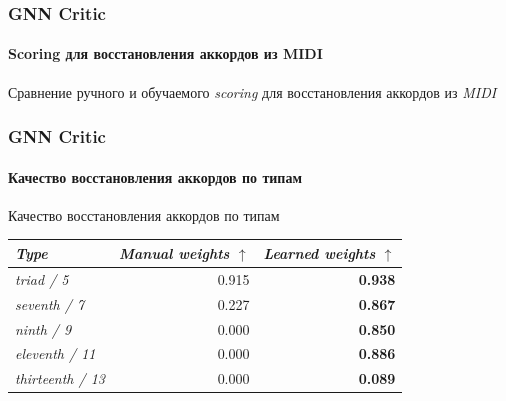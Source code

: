 \documentclass[aspectratio=169]{beamer}
\begin{document}
\begin{frame}
\frametitle{GNN Critic}
\framesubtitle{Scoring для восстановления аккордов из MIDI}
\begin{table}[htbp]
\centering
{\normalsize Сравнение ручного и обучаемого \textit{scoring} для восстановления аккордов из \textit{MIDI}}\\[0.25cm]
\label{tab:chord-prediction-scoring}
\scriptsize
{}
\end{table}
\end{frame}

\begin{frame}
\frametitle{GNN Critic}
\framesubtitle{Качество восстановления аккордов по типам}
\begin{table}[htbp]
\centering
{\normalsize Качество восстановления аккордов по типам}\\[0.25cm]
\label{tab:chord-type-accuracy}
\footnotesize
\begin{tabular}{@{}lrr@{}}
\toprule
\textit{Type} & \textit{Manual weights} $\uparrow$ & \textit{Learned weights} $\uparrow$ \\
\midrule
\textit{triad / 5} & 0.915 & \textbf{0.938} \\
\textit{seventh / 7} & 0.227 & \textbf{0.867} \\
\textit{ninth / 9} & 0.000 & \textbf{0.850} \\
\textit{eleventh / 11} & 0.000 & \textbf{0.886} \\
\textit{thirteenth / 13} & 0.000 & \textbf{0.089} \\
\bottomrule
\end{tabular}
\end{table}
\end{frame}
\end{document}
